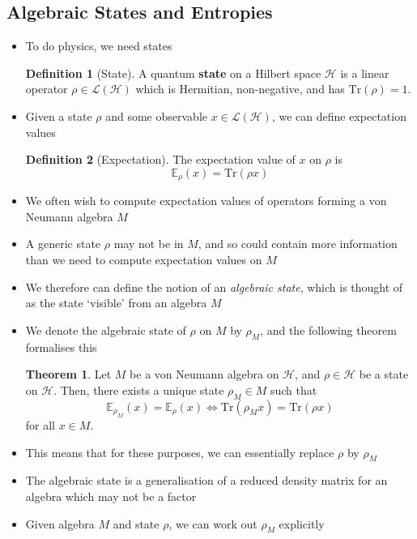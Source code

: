 \documentclass[12pt,a4paper]{article}
\numberwithin{equation}{section}
\theoremstyle{definition}
\newtheorem{definition}{Definition}[section]
\theoremstyle{theorem}
\newtheorem{theorem}{Theorem}[section]
\theoremstyle{example}
\begin{document}
	\subsection{Algebraic States and Entropies}
	\begin{itemize}
		\item To do physics, we need states
		\begin{definition}[State]
			A quantum \textbf{state} on a Hilbert space $\mathcal{H}$ is a linear operator $\rho\in\mathcal{L}(\mathcal{H})$ which is Hermitian, non-negative, and has $\text{Tr}(\rho)=1$.
		\end{definition}
		\item Given a state $\rho$ and some observable $x\in\mathcal{L}(\mathcal{H})$, we can define expectation values
		\begin{definition}[Expectation]
			The expectation value of $x$ on $\rho$ is
			\begin{equation}
				\mathbb{E}_{\rho}(x)=\text{Tr}(\rho x)
			\end{equation}
		\end{definition}
		\item We often wish to compute expectation values of operators forming a von Neumann algebra $M$
		\item A generic state $\rho$ may not be in $M$, and so could contain more information than we need to compute expectation values on $M$
		\item We therefore can define the notion of an \textit{algebraic state}, which is thought of as the state `visible' from an algebra $M$
		\item We denote the algebraic state of $\rho$ on $M$ by $\rho_{M}$, and the following theorem formalises this
		\begin{theorem}
			Let $M$ be a von Neumann algebra on $\mathcal{H}$, and $\rho\in\mathcal{H}$ be a state on $\mathcal{H}$. Then, there exists a unique state $\rho_{M}\in M$ such that
			\begin{equation}
				\mathbb{E}_{\rho_{M}}(x)=\mathbb{E}_{\rho}(x)\iff \text{Tr}(\rho_{M}x)=\text{Tr}(\rho x)
			\end{equation}
			for all $x\in M$.
		\end{theorem}
		\item This means that for these purposes, we can essentially replace $\rho$ by $\rho_{M}$
		\item The algebraic state is a generalisation of a reduced density matrix for an algebra which may not be a factor
		\item Given algebra $M$ and state $\rho$, we can work out $\rho_{M}$ explicitly

\end{itemize}
\end{document}
